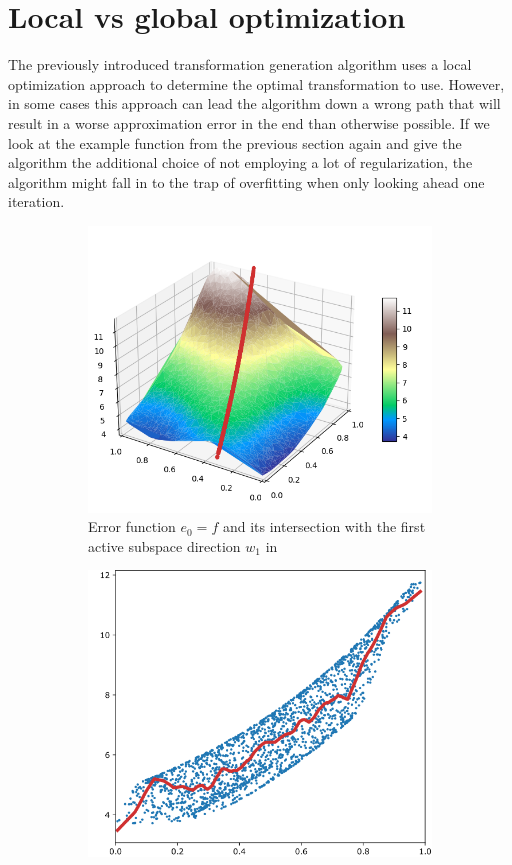 \documentclass[
  a4paper,  %
  twoside,  %
  bibliography=totoc,
  headsepline,
  cleardoublepage=empty,
  parskip=half,
  draft=false
]{scrbook}
\begin{document}
\section{Local vs global optimization}
\label{sec:lvsg}

The previously introduced transformation generation algorithm uses a local optimization approach to determine the optimal transformation to use.
However, in some cases this approach can lead the algorithm down a wrong path that will result in a worse approximation error in the end than otherwise possible.
If we look at the example function from the previous section again and give the algorithm the additional choice of not employing a lot of regularization, the algorithm might fall in to the trap of overfitting when only looking ahead one iteration.
\begin{mdframed}[style=style]
\begin{figure}[H]
\begin{subfigure}{.5\textwidth}
  \centering
  \includegraphics[width=.75\linewidth]{graphics/pipeline_bad_current_1.png}
  \caption{Error function $e_0=f$ and its intersection with the first active subspace direction $w_1$ in \reddot}
\label{fig:pipeline_bad_current_1}
\end{subfigure}%
\begin{subfigure}{.5\textwidth}
  \centering
  \includegraphics[width=.75\linewidth]{graphics/pipeline_bad_local_1.png}

\end{subfigure}
\end{figure}
\end{mdframed}
\end{document}
